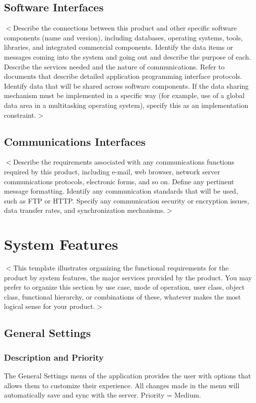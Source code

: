 \documentclass{scrreprt}
\begin{document}
\section{Software Interfaces}
$<$Describe the connections between this product and other specific software
components (name and version), including databases, operating systems, tools,
libraries, and integrated commercial components. Identify the data items or
messages coming into the system and going out and describe the purpose of each.
Describe the services needed and the nature of communications. Refer to
documents that describe detailed application programming interface protocols.
Identify data that will be shared across software components. If the data
sharing mechanism must be implemented in a specific way (for example, use of a
global data area in a multitasking operating system), specify this as an
implementation constraint.$>$

\section{Communications Interfaces}
$<$Describe the requirements associated with any communications functions
required by this product, including e-mail, web browser, network server
communications protocols, electronic forms, and so on. Define any pertinent
message formatting. Identify any communication standards that will be used, such
as FTP or HTTP. Specify any communication security or encryption issues, data
transfer rates, and synchronization mechanisms.$>$


\chapter{System Features}
$<$This template illustrates organizing the functional requirements for the
product by system features, the major services provided by the product. You may
prefer to organize this section by use case, mode of operation, user class,
object class, functional hierarchy, or combinations of these, whatever makes the
most logical sense for your product.$>$

\section{General Settings}

\subsection{Description and Priority}
The General Settings menu of the application provides the user with options that allows them to customize their experience. All changes made in the menu will automatically save and sync with the server. Priority = Medium.
\end{document}
